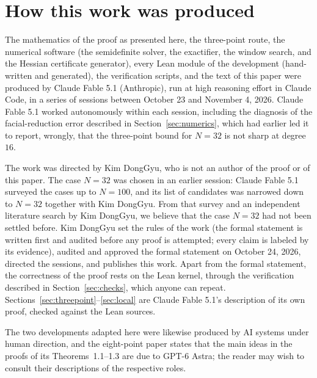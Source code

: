 \documentclass[11pt]{amsart}
\theoremstyle{definition}
\theoremstyle{remark}
\begin{document}
\section{How this work was produced}\label{sec:ai}

The mathematics of the proof as presented here, the three-point route, the numerical software (the semidefinite solver, the exactifier, the window search, and the Hessian certificate generator), every Lean module of the development (hand-written and generated), the verification scripts, and the text of this paper were produced by Claude Fable 5.1 (Anthropic), run at high reasoning effort in Claude Code, in a series of sessions between October 23 and November 4, 2026. Claude Fable 5.1 worked autonomously within each session, including the diagnosis of the facial-reduction error described in Section~\ref{sec:numerics}, which had earlier led it to report, wrongly, that the three-point bound for $N=32$ is not sharp at degree $16$.

The work was directed by Kim DongGyu, who is not an author of the proof or of this paper. The case $N=32$ was chosen in an earlier session: Claude Fable 5.1 surveyed the cases up to $N=100$, and its list of candidates was narrowed down to $N=32$ together with Kim DongGyu. From that survey and an independent literature search by Kim DongGyu, we believe that the case $N=32$ had not been settled before. Kim DongGyu set the rules of the work (the formal statement is written first and audited before any proof is attempted; every claim is labeled by its evidence), audited and approved the formal statement  on October 24, 2026, directed the sessions, and publishes this work. Apart from the formal statement, the correctness of the proof rests on the Lean kernel, through the verification described in Section~\ref{sec:checks}, which anyone can repeat. Sections~\ref{sec:threepoint}--\ref{sec:local} are Claude Fable 5.1's description of its own proof, checked against the Lean sources.

The two developments adapted here \cite{ThomsonN9,GrahamThomson102026} were likewise produced by AI systems under human direction, and the eight-point paper \cite{KLT2026} states that the main ideas in the proofs of its Theorems~1.1--1.3 are due to GPT-6 Astra; the reader may wish to consult their descriptions of the respective roles.


{\raggedright}
\end{document}
